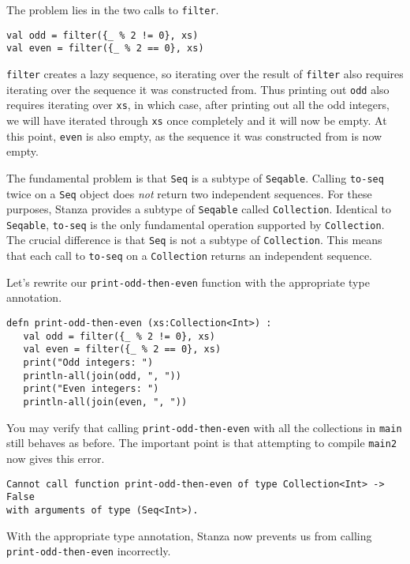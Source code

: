 \documentclass[10pt,oneside]{book}
\begin{document}
The problem lies in the two calls to \texttt{\frenchspacing filter}.
\begin{lstlisting}
val odd = filter({_ % 2 != 0}, xs)
val even = filter({_ % 2 == 0}, xs)
\end{lstlisting}
\texttt{\frenchspacing filter} creates a lazy sequence, so iterating over the result of \texttt{\frenchspacing filter} also requires iterating over the sequence it was constructed from. Thus printing out \texttt{\frenchspacing odd} also requires iterating over \texttt{\frenchspacing xs}, in which case, after printing out all the odd integers, we will have iterated through \texttt{\frenchspacing xs} once completely and it will now be empty. At this point, \texttt{\frenchspacing even} is also empty, as the sequence it was constructed from is now empty.

The fundamental problem is that \texttt{\frenchspacing Seq} is a subtype of \texttt{\frenchspacing Seqable}. Calling \texttt{\frenchspacing to-seq} twice on a \texttt{\frenchspacing Seq} object does {\em not} return two independent sequences. For these purposes, Stanza provides a subtype of \texttt{\frenchspacing Seqable} called \texttt{\frenchspacing Collection}. Identical to \texttt{\frenchspacing Seqable}, \texttt{\frenchspacing to-seq} is the only fundamental operation supported by \texttt{\frenchspacing Collection}. The crucial difference is that \texttt{\frenchspacing Seq} is not a subtype of \texttt{\frenchspacing Collection}. This means that each call to \texttt{\frenchspacing to-seq} on a \texttt{\frenchspacing Collection} returns an independent sequence. 

Let's rewrite our \texttt{\frenchspacing print-odd-then-even} function with the appropriate type annotation.
\begin{lstlisting}
defn print-odd-then-even (xs:Collection<Int>) :
   val odd = filter({_ % 2 != 0}, xs)
   val even = filter({_ % 2 == 0}, xs)
   print("Odd integers: ")
   println-all(join(odd, ", "))
   print("Even integers: ")
   println-all(join(even, ", "))
\end{lstlisting}

You may verify that calling \texttt{\frenchspacing print-odd-then-even} with all the collections in \texttt{\frenchspacing main} still behaves as before. The important point is that attempting to compile \texttt{\frenchspacing main2} now gives this error.
\begin{lstlisting}
Cannot call function print-odd-then-even of type Collection<Int> -> False
with arguments of type (Seq<Int>).
\end{lstlisting}
With the appropriate type annotation, Stanza now prevents us from calling \texttt{\frenchspacing print-odd-then-even} incorrectly.
\end{document}
